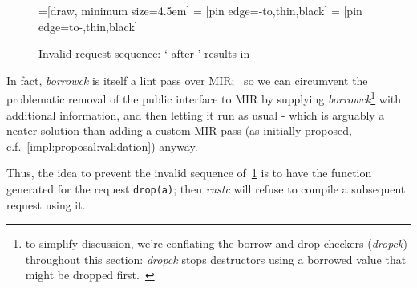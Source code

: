 \begin{figure}[!ht]
    \centering
    =[draw, minimum size=4.5em]
     = [pin edge={-to,thin,black}]
     = [pin edge={to-,thin,black}]
    \caption{Invalid request sequence: ` after ' results in }
    \label{fig:impl:sessions:get-after-delete}
\end{figure}

In fact, \emph{borrowck} is itself a lint pass over MIR;~\cite{borrowck} so we can circumvent the problematic removal of the public interface to MIR by supplying \emph{borrowck}\footnote{to simplify discussion, we're conflating the borrow and drop-checkers (\emph{dropck}) throughout this section: \emph{dropck} stops destructors using a borrowed value that might be dropped first.~\cite{rust_nomicon}} with additional information, and then letting it run as usual - which is arguably a neater solution than adding a custom MIR pass (as initially proposed,~\cite{interim} c.f.~\cref{impl:proposal:validation}) anyway.

Thus, the idea to prevent the invalid sequence of~\cref{fig:impl:sessions:get-after-delete} is to have the function generated for the  request \texttt{drop(a)}; then \emph{rustc} will refuse to compile a subsequent request using it.


